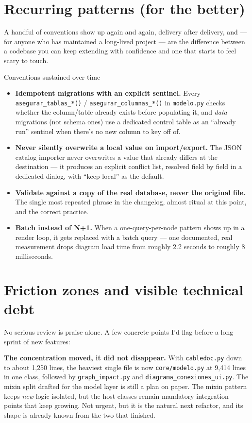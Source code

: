 \documentclass[10.4pt,twocolumn]{article}
\begin{document}
\section{Recurring patterns (for the better)}

A handful of conventions show up again and again, delivery after delivery, and --- for anyone who has maintained a long-lived project --- are the difference between a codebase you can keep extending with confidence and one that starts to feel scary to touch.

\begin{specbox}{Conventions sustained over time}
\begin{itemize}[leftmargin=1.0em,itemsep=2pt,topsep=2pt]
\item \textbf{Idempotent migrations with an explicit sentinel.} Every \texttt{asegurar\_tablas\_*()} / \texttt{asegurar\_columnas\_*()} in \texttt{modelo.py} checks whether the column/table already exists before populating it, and \emph{data} migrations (not schema ones) use a dedicated control table as an ``already run'' sentinel when there's no new column to key off of.
\item \textbf{Never silently overwrite a local value on import/export.} The JSON catalog importer never overwrites a value that already differs at the destination --- it produces an explicit conflict list, resolved field by field in a dedicated dialog, with ``keep local'' as the default.
\item \textbf{Validate against a copy of the real database, never the original file.} The single most repeated phrase in the changelog, almost ritual at this point, and the correct practice.
\item \textbf{Batch instead of N+1.} When a one-query-per-node pattern shows up in a render loop, it gets replaced with a batch query --- one documented, real measurement drops diagram load time from roughly 2.2 seconds to roughly 8 milliseconds.
\end{itemize}
\end{specbox}

\section{Friction zones and visible technical debt}

No serious review is praise alone. A few concrete points I'd flag before a long sprint of new features:

\textbf{The concentration moved, it did not disappear.} With \texttt{cabledoc.py} down to about 1{,}250 lines, the heaviest single file is now \texttt{core/modelo.py} at 9{,}414 lines in one class, followed by \texttt{graph\_impact.py} and \texttt{diagrama\_conexiones\_ui.py}. The mixin split drafted for the model layer is still a plan on paper. The mixin pattern keeps \emph{new} logic isolated, but the host classes remain mandatory integration points that keep growing. Not urgent, but it is the natural next refactor, and its shape is already known from the two that finished.
\end{document}
